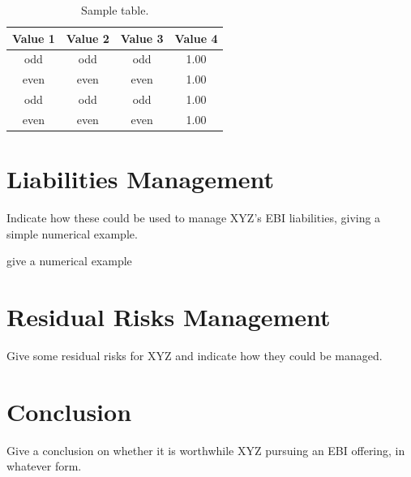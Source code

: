 \documentclass[12pt]{article}
\begin{document}
\begin{table}[!h]
\centering
\caption{Sample table.}
\begin{tabular}{cccc}
\toprule
Value 1 & Value 2 & Value 3 & Value 4\\
\midrule
 odd     & odd   & odd & 1.00 \\
 even    & even  & even& 1.00 \\
 odd     & odd   & odd & 1.00 \\
 even    & even  & even& 1.00 \\
\bottomrule
\end{tabular}
\end{table}

\section{Liabilities Management}
Indicate how these could be used to manage XYZ’s EBI liabilities, giving a simple numerical example. \par

give a numerical example
\frameboxend


\section{Residual Risks Management}
Give some residual risks for XYZ and indicate how they could be managed. 

\section{Conclusion}
Give a conclusion on whether it is worthwhile XYZ pursuing an EBI offering, in whatever form. 
\end{document}
